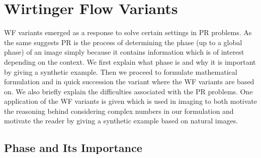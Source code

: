 \section{Wirtinger Flow Variants}
\ac{WF} variants emerged as a response to solve certain settings in \acl*{PR} problems. As the same suggests \acl*{PR} is the process of 
determining the phase (up to a global phase) of an image simply because it contains information which is of interest depending on the context. We first explain 
what phase is and why it is important by giving a synthetic example. Then we proceed to formulate mathematical formulation and in quick succession 
the variant where the \ac{WF} variants are based on. We also briefly explain the difficulties associated with the \acl*{PR} problems. 
 One application of the \ac{WF} variants is given which is used in imaging to both motivate the reasoning behind 
 considering complex numbers in our formulation and motivate the reader by giving a synthetic example based on 
natural images. 
\subsection{Phase and Its Importance}\label{sec:phase_importance}

